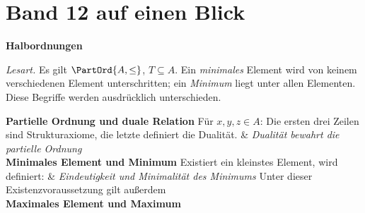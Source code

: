 \chapter[Band 12: Halbordnungen]{Band 12 auf einen Blick}
\noindent\textbf{Halbordnungen}\par\medskip
\noindent\emph{Lesart.} Es gilt \(\PartOrd{A,\leq}\),
\(T\subseteq A\). Ein \emph{minimales} Element wird von keinem
verschiedenen Element unterschritten; ein \emph{Minimum} liegt unter
allen Elementen. Diese Begriffe werden ausdrücklich unterschieden.
\begin{BandUebersicht}
\textbf{Partielle Ordnung und duale Relation}
Für \(x,y,z\in A\):
Die ersten drei Zeilen sind Strukturaxiome, die letzte definiert die Dualität.
&
\textit{Dualität bewahrt die partielle Ordnung}
\\
\addlinespace[.8ex]
\textbf{Minimales Element und Minimum}
Existiert ein kleinstes Element, wird definiert:
&
\textit{Eindeutigkeit und Minimalität des Minimums}
Unter dieser Existenzvoraussetzung gilt außerdem
\\
\addlinespace[.8ex]
\textbf{Maximales Element und Maximum}

\end{BandUebersicht}
